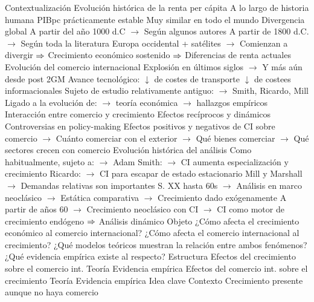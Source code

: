 \documentclass{nuevotema}
\begin{document}
\begin{esquemal}
	\1[] 
		\2 Contextualización
			\3 Evolución histórica de la renta per cápita
				\4 A lo largo de historia humana
				\4[] PIBpc prácticamente estable
				\4[] Muy similar en todo el mundo
				\4 Divergencia global
				\4[] A partir del año 1000 d.C
				\4[] $\to$ Según algunos autores
				\4[] A partir de 1800 d.C.
				\4[] $\to$ Según toda la literatura
				\4[] Europa occidental + satélites
				\4[] $\to$ Comienzan a divergir
				\4[] $\Rightarrow$ Crecimiento económico sostenido
				\4[] $\Rightarrow$ Diferencias de renta actuales
			\3 Evolución del comercio internacional
				\4 Explosión en últimos siglos
				\4[] $\to$ Y más aún desde post 2GM
				\4 Avance tecnológico:
				\4[] $\downarrow$ de costes de transporte
				\4[] $\downarrow$ de costees informacionales
				\4 Sujeto de estudio relativamente antiguo:
				\4[] $\to$ Smith, Ricardo, Mill
				\4[] Ligado a la evolución de:
				\4[] $\to$ teoría económica
				\4[] $\to$ hallazgos empíricos
			\3 Interacción entre comercio y crecimiento
				\4 Efectos recíprocos y dinámicos
				\4 Controversias en policy-making
				\4[] Efectos positivos y negativos de CI sobre comercio
				\4[] $\to$ Cuánto comerciar con el exterior
				\4[] $\to$ Qué bienes comerciar
				\4[] $\to$ Qué sectores crecen con comercio
				\4 Evolución histórica del análisis
				\4[] Como habitualmente, sujeto a:
				\4[] $\to$
				\4[] Adam Smith:
				\4[] $\to$ CI aumenta especialización y crecimiento
				\4[] Ricardo:
				\4[] $\to$ CI para escapar de estado estacionario
				\4[] Mill y Marshall
				\4[] $\to$ Demandas relativas son importantes
				\4[] S. XX hasta 60s
				\4[] $\to$ Análisis en marco neoclásico
				\4[] $\to$ Estática comparativa
				\4[] $\to$ Crecimiento dado exógenamente
				\4[] A partir de años 60
				\4[] $\to$ Crecimiento neoclásico con CI
				\4[] $\to$ CI como motor de crecimiento endógeno
				\4[] $\Rightarrow$ Análisis dinámico
		\2 Objeto
			\3 ¿Cómo afecta el crecimiento económico al comercio internacional?
			\3 ¿Cómo afecta el comercio internacional al crecimiento?
			\3 ¿Qué modelos teóricos muestran la relación entre ambos fenómenos?
			\3 ¿Qué evidencia empírica existe al respecto?
		\2 Estructura
			\3 Efectos del crecimiento sobre el comercio int.
				\4 Teoría
				\4 Evidencia empírica
			\3 Efectos del comercio int. sobre el crecimiento
				\4 Teoría
				\4 Evidencia empírica
	\1 
		\2 Idea clave
			\3 Contexto
				\4 Crecimiento presente aunque no haya comercio

\end{esquemal}
\end{document}
